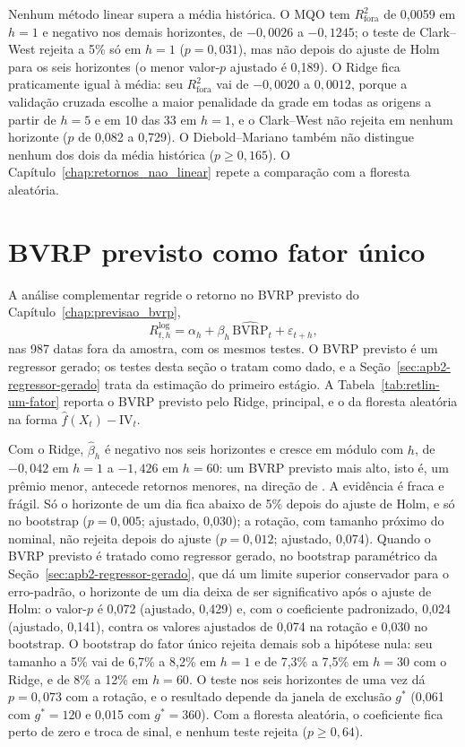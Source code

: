 

Nenhum método linear supera a média histórica. O MQO tem $R^2_{\text{fora}}$
de 0,0059 em $h = 1$ e negativo nos demais horizontes, de $-0{,}0026$ a
$-0{,}1245$; o teste de Clark--West rejeita a 5\% só em $h = 1$
($p = 0{,}031$), mas não depois do ajuste de Holm para os seis horizontes (o
menor valor-$p$ ajustado é 0,189). O Ridge fica praticamente igual à média:
seu $R^2_{\text{fora}}$ vai de $-0{,}0020$ a $0{,}0012$, porque a validação
cruzada escolhe a maior penalidade da grade em todas as origens a partir de
$h = 5$ e em 10 das 33 em $h = 1$, e o
Clark--West não rejeita em nenhum horizonte ($p$ de 0,082 a 0,729). O
Diebold--Mariano também não distingue nenhum dos dois da média histórica
($p \ge 0{,}165$). O Capítulo~\ref{chap:retornos_nao_linear} repete a
comparação com a floresta aleatória.

\section{BVRP previsto como fator único}
\label{sec:retlin-um-fator}

A análise complementar regride o retorno no BVRP previsto do
Capítulo~\ref{chap:previsao_bvrp},
\[
R^{\log}_{t,h} = \alpha_h + \beta_h\,\widehat{\text{BVRP}}_t + \varepsilon_{t+h},
\]
nas 987 datas fora da amostra, com os mesmos testes. O BVRP previsto é um
regressor gerado; os testes desta seção o tratam como dado, e a
Seção~\ref{sec:apb2-regressor-gerado} trata da estimação do primeiro estágio. A Tabela~\ref{tab:retlin-um-fator}
reporta o BVRP previsto pelo Ridge, principal, e o da floresta aleatória na
forma $\hat f(X_t) - \text{IV}_t$.



Com o Ridge, $\hat\beta_h$ é negativo nos seis horizontes e cresce em módulo
com $h$, de $-0{,}042$ em $h = 1$ a $-1{,}426$ em $h = 60$: um BVRP previsto
mais alto, isto é, um prêmio menor, antecede retornos menores, na direção de
\citet{bollerslev2009expected}. A evidência é fraca e frágil. Só o horizonte
de um dia fica abaixo de 5\% depois do ajuste de Holm, e só no bootstrap
($p = 0{,}005$; ajustado, 0,030); a rotação, com tamanho próximo do nominal,
não rejeita depois do ajuste ($p = 0{,}012$; ajustado, 0,074). Quando o BVRP
previsto é tratado como regressor gerado, no bootstrap paramétrico da
Seção~\ref{sec:apb2-regressor-gerado}, que dá um limite superior conservador
para o erro-padrão, o horizonte de um dia deixa de ser significativo após o
ajuste de Holm: o valor-$p$ é 0,072 (ajustado, 0,429) e, com o coeficiente
padronizado, 0,024 (ajustado, 0,141), contra os valores ajustados de 0,074 na
rotação e 0,030 no bootstrap. O bootstrap do
fator único rejeita demais sob a hipótese nula: seu tamanho a 5\% vai de
6,7\% a 8,2\% em $h = 1$ e de 7,3\% a 7,5\% em $h = 30$ com o Ridge, e de 8\%
a 12\% em $h = 60$. O teste nos seis horizontes de uma vez dá $p = 0{,}073$
com a rotação, e o resultado depende da janela de exclusão $g^*$ (0,061 com
$g^* = 120$ e 0,015 com $g^* = 360$). Com a floresta aleatória, o coeficiente
fica perto de zero e troca de sinal, e nenhum teste rejeita ($p \ge 0{,}64$).

